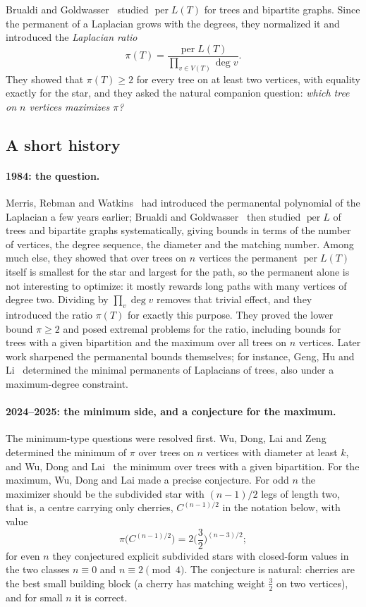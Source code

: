 \documentclass[11pt]{article}
\theoremstyle{definition}
\newcommand{\per}{\operatorname{per}}
\renewcommand{\deg}{\operatorname{deg}}
\begin{document}
Brualdi and Goldwasser~\cite{BG1984} studied $\per L(T)$ for trees and bipartite graphs. Since the
permanent of a Laplacian grows with the degrees, they normalized it and introduced the
\emph{Laplacian ratio}
\[
  \pi(T)=\frac{\per L(T)}{\prod_{v\in V(T)}\deg v}.
\]
They showed that $\pi(T)\ge 2$ for every tree on at least two vertices, with equality exactly for the
star, and they asked the natural companion question: \emph{which tree on $n$ vertices maximizes $\pi$?}

\subsection{A short history}

\paragraph{1984: the question.} Merris, Rebman and Watkins~\cite{MRW1981} had introduced the
permanental polynomial of the Laplacian a few years earlier; Brualdi and Goldwasser~\cite{BG1984} then
studied $\per L$ of trees and bipartite graphs systematically, giving bounds in terms of the number of
vertices, the degree sequence, the diameter and the matching number. Among much else, they showed that over trees on $n$ vertices the permanent
$\per L(T)$ itself is smallest for the star and largest for the path, so the permanent alone is not
interesting to optimize: it mostly rewards long paths with many vertices of degree two. Dividing by
$\prod_v\deg v$ removes that trivial effect, and they introduced the ratio $\pi(T)$ for exactly this
purpose. They proved the lower bound $\pi\ge2$ and posed extremal problems for the ratio, including
bounds for trees with a given bipartition and the maximum over all trees on $n$ vertices. Later work
sharpened the permanental bounds themselves; for instance, Geng, Hu and Li~\cite{GHL2010} determined the
minimal permanents of Laplacians of trees, also under a maximum-degree constraint.

\paragraph{2024--2025: the minimum side, and a conjecture for the maximum.} The minimum-type questions
were resolved first. Wu, Dong, Lai and Zeng~\cite{Wu2024} determined the minimum of $\pi$ over trees on $n$ vertices with
diameter at least $k$, and Wu, Dong and Lai~\cite{WDL2025} the minimum over trees with a given
bipartition. For the maximum, Wu, Dong and Lai made a precise conjecture. For odd $n$ the maximizer should
be the subdivided star with $(n-1)/2$ legs of length two, that is, a centre carrying only cherries,
$C^{(n-1)/2}$ in the notation below, with value
\[
  \pi\big(C^{(n-1)/2}\big)=2\Big(\frac32\Big)^{(n-3)/2};
\]
for even $n$ they conjectured explicit subdivided stars with closed-form values in the two classes
$n\equiv0$ and $n\equiv2\pmod4$. The conjecture is natural: cherries are the best small building block
(a cherry has matching weight $\tfrac32$ on two vertices), and for small $n$ it is correct.
\end{document}
